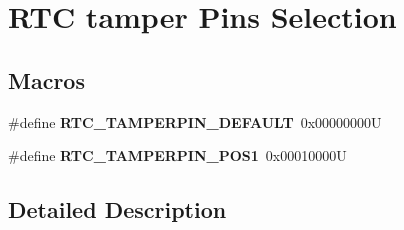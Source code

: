 \hypertarget{group___r_t_c_ex___tamper___pins___selection}{}\section{R\+TC tamper Pins Selection}
\label{group___r_t_c_ex___tamper___pins___selection}
\subsection*{Macros}
\begin{DoxyCompactItemize}
\item 
\mbox{\label{group___r_t_c_ex___tamper___pins___selection_gaa72ee32c246f9957ffbe30ff4bfcb96b}} 
\#define {\bfseries R\+T\+C\+\_\+\+T\+A\+M\+P\+E\+R\+P\+I\+N\+\_\+\+D\+E\+F\+A\+U\+LT}~0x00000000U
\item 
\mbox{\label{group___r_t_c_ex___tamper___pins___selection_ga9ad3dfb9f322a83fa90ed267e4b18aa8}} 
\#define {\bfseries R\+T\+C\+\_\+\+T\+A\+M\+P\+E\+R\+P\+I\+N\+\_\+\+P\+O\+S1}~0x00010000U
\end{DoxyCompactItemize}


\subsection{Detailed Description}

